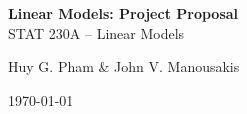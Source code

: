 \documentclass{article}
\begin{document}
\begin{titlepage}
	\begin{center}
		\vspace*{\fill}

		\LARGE 
		\textbf{Linear Models: Project Proposal}\\
		\vspace{0.5cm}
		\large STAT 230A -- Linear Models\\
		\vspace{0.5cm}
		
%		
%		
		
		\Large Huy G. Pham \& John V. Manousakis
		
		\vspace{0.5cm}
		\today
		
		\vspace*{\fill}
	\end{center}
\end{titlepage}

\newpage






\end{document}
